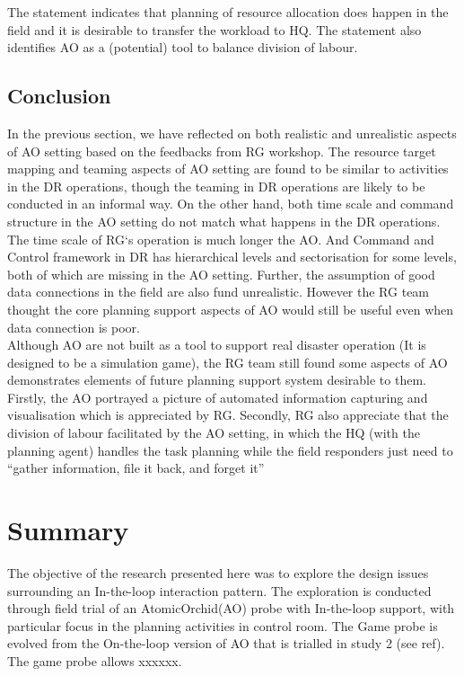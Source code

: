 The statement indicates that planning of resource allocation does happen in the field and it is desirable to transfer the workload to HQ. The statement also identifies AO as a (potential) tool to balance division of labour. 


\subsection{Conclusion}
In the previous section, we have reflected on both realistic and unrealistic aspects of AO setting based on the feedbacks from RG workshop. The resource target mapping and teaming aspects of AO setting are found to be similar to activities in the DR operations, though the teaming in DR operations are likely to be conducted in an informal way. On the other hand, both time scale and command structure in the AO setting do not match what happens in the DR operations. The time scale of RG`s operation is much longer the AO. And Command and Control framework in DR has hierarchical levels and sectorisation for some levels, both of which are missing in the AO setting. Further, the assumption of good data connections in the field are also fund unrealistic. However the RG team thought the core planning support aspects of AO would still be useful even when data connection is poor. \\

Although AO are not built as a tool to support real disaster operation (It is designed to be a simulation game), the RG team still found some aspects of AO demonstrates elements of future planning support system desirable to them. Firstly, the AO portrayed a picture of automated information capturing and visualisation which is appreciated by RG. Secondly, RG also appreciate that the division of labour facilitated by the AO setting, in which the HQ (with the planning agent) handles the task planning while the field responders just need to ``gather information, file it back, and forget it''\\

\section{Summary}
The objective of the research presented here was to explore the design issues surrounding an In-the-loop interaction pattern. The exploration is conducted through field trial of an AtomicOrchid(AO) probe with In-the-loop support, with particular focus in the planning activities in control room. The Game probe is evolved from the On-the-loop version of AO that is trialled in study 2 (see ref). The game probe allows xxxxxx. 

